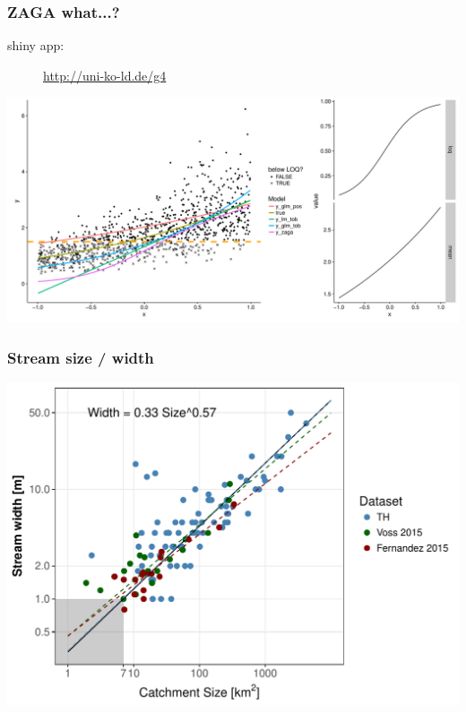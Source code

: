 \documentclass[
	10pt
	]{beamer}
\begin{document}
\begin{frame}
\frametitle{ZAGA what...?}
	\begin{description}
		\item[shiny app: ]{\url{http://uni-ko-ld.de/g4}}
	\end{description}
	\includegraphics[width=\textwidth]{figs/zaga_mods.pdf}
\end{frame}


\begin{frame}
\frametitle{Stream size / width}
	  \includegraphics[width=\textwidth]{figs/width_size.pdf}
\end{frame}
\end{document}

